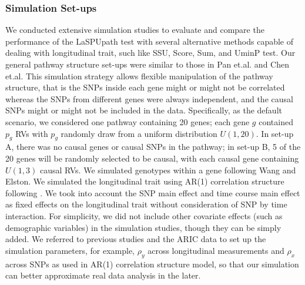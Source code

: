 \documentclass[12pt]{article}
\begin{document}
\subsubsection{Simulation Set-ups}\label{sec:sim_pathway_test}
We conducted extensive simulation studies to evaluate and compare the performance of the LaSPUpath test with several alternative methods capable of dealing with longitudinal trait, such like SSU, Score, Sum, and UminP test. Our general pathway structure set-ups were similar to those in Pan et.al.\cite{Pan2015} and Chen et.al.\cite{Chen2010} This simulation strategy allows flexible manipulation of the pathway structure, that is the SNPs inside each gene might or might not be correlated whereas the SNPs from different genes were always independent, and the causal SNPs might or might not be included in the data. Specifically, as the default scenario, we considered one pathway containing 20 genes; each gene $g$ contained $p_g$ RVs with $p_g$ randomly draw from a uniform distribution $U(1,20)$. In set-up A, there was no causal genes or causal SNPs in the pathway; in set-up B, 5 of the 20 genes will be randomly selected to be causal, with each causal gene containing $U(1,3)$ causal RVs. We simulated genotypes within a gene following Wang and Elston.\cite{Wang2007} We simulated the longitudinal trait using AR(1) correlation structure following \cite{Song2013}. We took into account the SNP main effect and time course main effect as fixed effects on the longitudinal trait {without consideration of SNP by time interaction}. For simplicity, we did not include other covariate effects (such as demographic variables) in the simulation studies, though they can be simply added. We referred to previous studies \cite{pan2014powerful,Basu2011,Pan2011,Han2010,Pan2009} and the ARIC data to set up the simulation parameters, for example, $\rho_y$ across longitudinal measurements and $\rho_x$ across SNPs as used in AR(1) correlation structure model, so that our simulation can better approximate real data analysis in the later.

\end{document}
